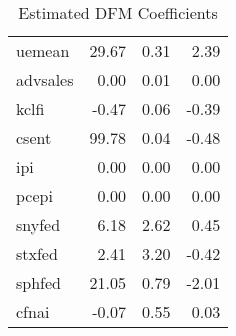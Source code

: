\documentclass[11pt, letterpaper]{article}\usepackage[]{graphicx}\usepackage[]{color}
\begin{document}
\begin{table}[H]
\begin{tabular}{lrrr}
  uemean & 29.67 & 0.31 & 2.39 \\ 
  advsales & 0.00 & 0.01 & 0.00 \\ 
  kclfi & -0.47 & 0.06 & -0.39 \\ 
  csent & 99.78 & 0.04 & -0.48 \\ 
  ipi & 0.00 & 0.00 & 0.00 \\ 
  pcepi & 0.00 & 0.00 & 0.00 \\ 
  snyfed & 6.18 & 2.62 & 0.45 \\ 
  stxfed & 2.41 & 3.20 & -0.42 \\ 
  sphfed & 21.05 & 0.79 & -2.01 \\ 
  cfnai & -0.07 & 0.55 & 0.03 \\ 
   \hline
\end{tabular}
\endgroup
\caption{Estimated DFM Coefficients} 
\end{table}
\end{document}
